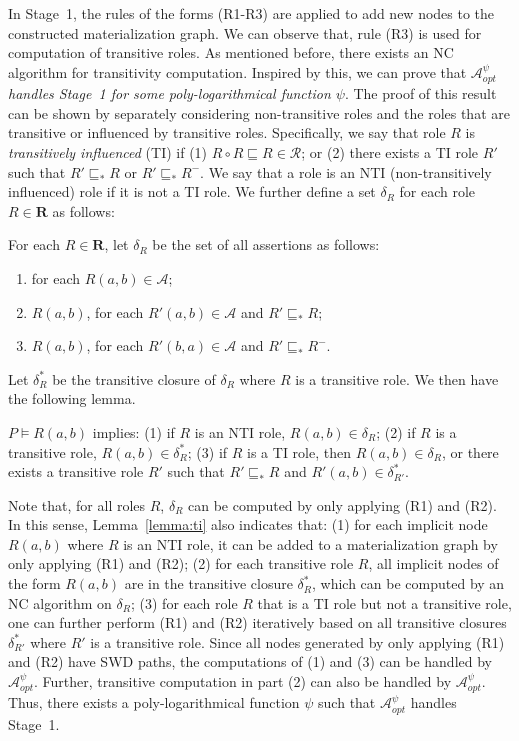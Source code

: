 \documentclass[final,1p,times]{elsarticle}
\begin{document}
In Stage~1, the rules of the forms (R1-R3)
are applied to add new nodes to the constructed materialization graph.
We can observe that, rule (R3) is used for computation of transitive roles.
As mentioned before, there exists an NC algorithm for transitivity computation.
Inspired by this, we can prove that \emph{$\mathcal{A}_{opt}^\psi$
handles Stage~1 for some poly-logarithmical function $\psi$}.
The proof of this result can be shown by separately considering non-transitive roles and
the roles that are transitive or influenced by transitive roles.
Specifically, we say that role $R$ is \emph{transitively influenced} (TI)
if (1) $R\circ R\sqsubseteq R\in\mathcal{R}$; or
(2) there exists a TI role $R'$ such that $R'\sqsubseteq_*R$ or $R'\sqsubseteq_*R^-$.
We say that a role is an NTI (non-transitively influenced) role if it is not a TI role.
We further define a set $\delta_R$ for each role $R\in\textbf{R}$ as follows:

\begin{definition}\label{def:deltaRdhl}
For each $R\in\textbf{R}$, let $\delta_R$ be the set of all assertions as follows:
\begin{enumerate}[leftmargin=4ex,label=\arabic*.]
\item for each $R(a,b)\in\mathcal{A}$;
\item $R(a,b)$, for each $R'(a,b)\in\mathcal{A}$ and $R'\sqsubseteq_{*}R$;
\item $R(a,b)$, for each $R'(b,a)\in\mathcal{A}$ and $R'\sqsubseteq_{*}R^-$.
\end{enumerate}
\end{definition}

Let $\delta^*_R$ be the transitive closure of $\delta_R$ where $R$ is a transitive role.
We then have the following lemma.

\begin{lemma}\label{lemma:ti}
$P\models R(a,b)$ implies: (1) if $R$ is an NTI role, $R(a,b)\in\delta_R$;
(2) if $R$ is a transitive role, $R(a,b)\in\delta^*_{R}$;
(3) if $R$ is a TI role, then $R(a,b)\in\delta_R$, or there exists a transitive
role $R'$ such that $R'\sqsubseteq_* R$ and $R'(a,b)\in\delta^*_{R'}$.
\end{lemma}

Note that, for all roles $R$, $\delta_R$ can be computed by only applying (R1) and (R2).
In this sense, Lemma~\ref{lemma:ti} also indicates that:
(1) for each implicit node $R(a,b)$ where $R$ is an NTI role,
it can be added to a materialization graph by only applying (R1) and (R2);
(2) for each transitive role $R$, all implicit nodes of the form $R(a,b)$ are in the transitive closure $\delta^*_{R}$,
which can be computed by an NC algorithm on $\delta_{R}$;
(3) for each role $R$ that is a TI role but not a transitive role,
one can further perform (R1) and (R2) iteratively based on all transitive closures $\delta^*_{R'}$
where $R'$ is a transitive role.
Since all nodes generated by only applying (R1) and (R2) have SWD paths,
the computations of (1) and (3) can be handled by $\mathcal{A}_{opt}^\psi$.
Further, transitive computation in part (2) can also be handled by $\mathcal{A}_{opt}^\psi$.
Thus, there exists a poly-logarithmical function $\psi$
such that $\mathcal{A}_{opt}^\psi$ handles Stage~1.
\end{document}
